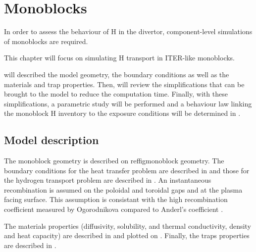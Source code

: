 \setchapterpreamble[u]{\margintoc}
\chapter{Monoblocks}\label{Chapter3}

In order to assess the behaviour of H in the divertor, component-level simulations of monoblocks are required.

This chapter will focus on simulating H transport in ITER-like monoblocks.

 will described the model geometry, the boundary conditions as well as the materials and trap properties.
Then,  will review the simplifications that can be brought to the model to reduce the computation time.
Finally, with these simplifications, a parametric study will be performed and a behaviour law linking the monoblock H inventory to the exposure conditions will be determined in .

\section{Model description}

The monoblock geometry is described on reffig{monoblock geometry}.
The boundary conditions for the heat transfer problem are described in  and those for the hydrogen transport problem are described in .
An instantaneous recombination is assumed on the poloidal and toroidal gaps and at the plasma facing surface.
This assumption is consistant with the high recombination coefficient measured by Ogorodnikova  compared to Anderl's coefficient .

The materials properties (diffusivity, solubility, and thermal conductivity, density and heat capacity) are described in  and plotted on .
Finally, the traps properties are described in .

